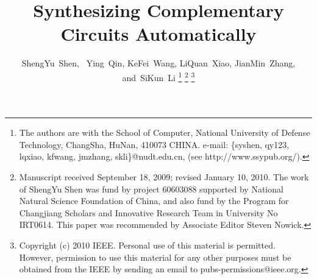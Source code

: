 \documentclass[journal]{IEEEtran}
\begin{document}
%
\title{Synthesizing Complementary Circuits Automatically}
%
%
%


\author{ShengYu~Shen,~
        Ying~Qin,
        KeFei~Wang,
        LiQuan~Xiao,
        JianMin~Zhang,
        and~SiKun~Li%
\thanks{The authors are with the School of Computer,
National University of Defense Technology, ChangSha,
HuNan, 410073 CHINA. e-mail: \{syshen, qy123, lqxiao, kfwang, jmzhang, skli\}@nudt.edu.cn, (see http://www.ssypub.org/).}%
\thanks{Manuscript received September 18, 2009; revised January 10, 2010.
The work of ShengYu Shen was fund by project 60603088 supported by National Natural Science Foundation of China,
and also fund by the Program for Changjiang
Scholars and Innovative Research Team in University No
IRT0614.
This paper was recommended by Associate Editor Steven Nowick.}
\thanks{Copyright (c) 2010 IEEE. Personal use of this material is
permitted. However, permission to use this material
for any other purposes must be obtained from the IEEE by
sending an email to pubs-permissions@ieee.org.}}
\end{document}
